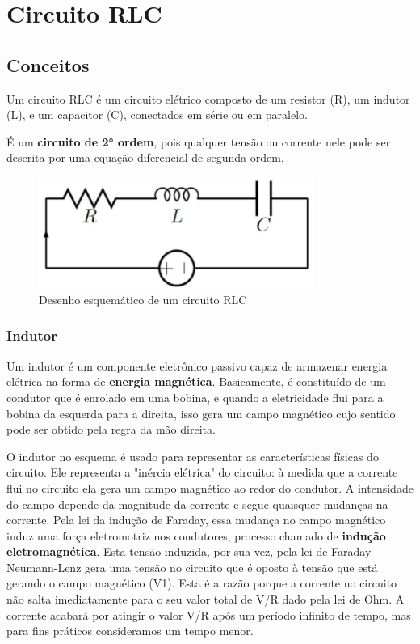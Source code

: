 \section{Circuito RLC}

\subsection{Conceitos}

Um circuito RLC é um circuito elétrico composto de um resistor (R), um indutor (L), e um capacitor (C), conectados em série ou em paralelo.

É um \textbf{circuito de 2° ordem}, pois qualquer tensão ou corrente nele pode ser descrita por uma equação diferencial de segunda ordem.

\begin{figure}[H]
	\centering
	\includegraphics[width=0.8\textwidth]{./Imagens/RLC/rlc1.png} 
	\caption{Desenho esquemático de um circuito RLC}
	\label{fig:RLC1}
\end{figure}

\subsubsection{Indutor}

Um indutor é um componente eletrônico passivo capaz de armazenar energia elétrica na forma de \textbf{energia magnética}. Basicamente, é constituído de um condutor que é enrolado em uma bobina, e quando a eletricidade flui para a bobina da esquerda para a direita, isso gera um campo magnético cujo sentido pode ser obtido pela regra da mão direita.

O indutor no esquema é usado para representar as características físicas do circuito. Ele representa a "inércia elétrica" do circuito: à medida que a corrente flui no circuito ela gera um campo magnético ao redor do condutor. A intensidade do campo depende da magnitude da corrente e segue quaisquer mudanças na corrente. Pela lei da indução de Faraday, essa mudança no campo magnético induz uma força eletromotriz nos condutores, processo chamado de \textbf{indução eletromagnética}. Esta tensão induzida, por sua vez, pela lei de Faraday-Neumann-Lenz gera uma tensão no circuito que é oposto à tensão que está gerando o campo magnético (V1). Esta é a razão porque a corrente no circuito não salta imediatamente para o seu valor total de V/R dado pela lei de Ohm. A corrente acabará por atingir o valor V/R após um período infinito de tempo, mas para fins práticos consideramos um tempo menor.

